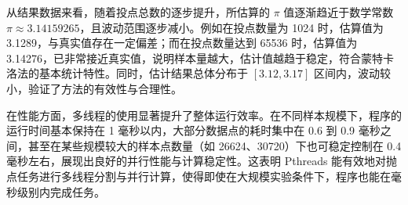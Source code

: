 \documentclass[a4paper, utf8]{ctexart}
\begin{document}
	从结果数据来看，随着投点总数的逐步提升，所估算的 $\pi$ 值逐渐趋近于数学常数 $\pi \approx 3.14159265$，且波动范围逐步减小。例如在投点数量为 1024 时，估算值为 3.1289，与真实值存在一定偏差；而在投点数量达到 65536 时，估算值为 3.14276，已非常接近真实值，说明样本量越大，估计值越趋于稳定，符合蒙特卡洛法的基本统计特性。同时，估计结果总体分布于 $[3.12, 3.17]$ 区间内，波动较小，验证了方法的有效性与合理性。
	
	在性能方面，多线程的使用显著提升了整体运行效率。在不同样本规模下，程序的运行时间基本保持在 1 毫秒以内，大部分数据点的耗时集中在 0.6 到 0.9 毫秒之间，甚至在某些规模较大的样本点数量（如 26624、30720）下也可稳定控制在 0.4 毫秒左右，展现出良好的并行性能与计算稳定性。这表明 Pthreads 能有效地对抛点任务进行多线程分割与并行计算，使得即使在大规模实验条件下，程序也能在毫秒级别内完成任务。
	
\end{document}

